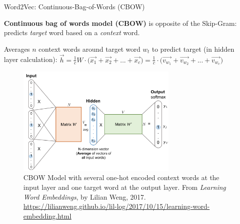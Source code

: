 \begin{frame}{Word2Vec: Continuous-Bag-of-Words (CBOW)}\label{frame:CBOW}
    
    \begin{itemizeSpaced}{0pt}
        \pinkbox \textbf{Continuous bag of words model (CBOW)} is opposite of the Skip-Gram: predicts \emph{target} word based on a \emph{context} word. 
        
        \item Averages $n$ context words around target word $w_t$ to predict target (in hidden layer calculation): %
        $
        \overrightarrow{h} 
        = \frac{1}{c} W \cdot \Big(\overrightarrow{x_1} + \overrightarrow{x_2} + ... + \overrightarrow{x_c} \Big) 
        = \frac{1}{c} \cdot \Big(\overrightarrow{v_{w_1}} + \overrightarrow{v_{w_2}} + ... + \overrightarrow{v_{w_c}} \Big)
        $
        
    \end{itemizeSpaced}
    
    \begin{figure}[h] 
    \vspace{-5pt}
    \centering
    \includegraphics[width=0.7\textwidth]{imgs/cbow.png}
    \vspace{-5pt}
    \caption{\tiny CBOW Model with several one-hot encoded context words at the input layer and one target word at the output layer. From \emph{Learning Word Embeddings}, by Lilian Weng, 2017. \url{https://lilianweng.github.io/lil-log/2017/10/15/learning-word-embedding.html}}
    \label{fig:CBOW}
    \vspace{-5pt}
    \end{figure}
    
    
\end{frame}



